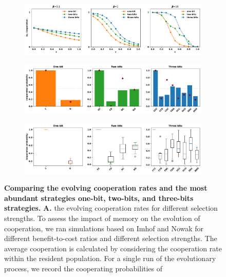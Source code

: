 \documentclass{article}
\theoremstyle{definition}
\begin{document}
\begin{figure}[htbp]
  \centering
  \begin{subfigure}{0.85\textwidth}
      \centering
      \includegraphics[width=\textwidth]{static/average_cooperation_over_c_with_diff_selection_strength.pdf}
  \end{subfigure}
  \hfill
  \begin{subfigure}{0.85\textwidth}
      \centering
      \includegraphics[width=\textwidth]{static/evolution_results_barplots.pdf}
  \end{subfigure}
  \hfill
  \begin{subfigure}{0.85\textwidth}
      \centering
      \includegraphics[width=\textwidth]{static/evolution_results_boxplots.pdf}
  \end{subfigure}
  \caption{\textbf{Comparing the evolving cooperation rates and the most
  abundant strategies  one-bit, two-bits, and three-bits strategies.}
  \textbf{A.} the evolving cooperation rates for different selection strengths.
  To assess the impact of memory on the evolution of cooperation, we ran
  simulations based on Imhof and Nowak for different benefit-to-cost ratios and
  different selection strengths. The average cooperation is calculated by
  considering the cooperation rate within the resident population. For a single
  run of the evolutionary process, we record the cooperating probabilities of
}
\end{figure}
\end{document}
